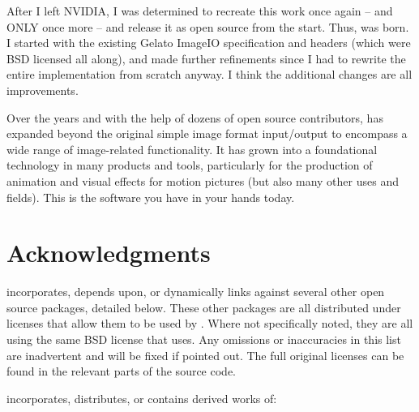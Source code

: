 After I left NVIDIA, I was determined to recreate this work once
again -- and ONLY once more -- and release it as open source from the
start.  Thus, \product was born.  I started with the existing Gelato
ImageIO specification and headers (which were BSD licensed all along),
and made further refinements since I had to rewrite the entire
implementation from scratch anyway.  I think the additional changes are
all improvements.

Over the years and with the help of dozens of open source contributors,
\product has expanded beyond the original simple image format input/output
to encompass a wide range of image-related functionality. It has grown into
a foundational technology in many products and tools, particularly for the
production of animation and visual effects for motion pictures (but also
many other uses and fields). This is the software you have in your hands
today.


\section{Acknowledgments}

\begin{comment}
The direct precursor to \product was Gelato's ImageIO, which was
co-designed and implemented by Larry Gritz, Dan Wexler, Jonathan Rice, Eric
Enderton, and Philip Nemec.

Big thanks to our bosses at NVIDIA for allowing us to share the API spec
and headers under the BSD license.  And thanks to their inability to
open source their own implementation in a timely manner, I was forced to
create this clearly superior descendant.
\end{comment}

\product incorporates, depends upon, or dynamically links against several
other open source packages, detailed below. These other packages are all
distributed under licenses that allow them to be used by \product. Where not
specifically noted, they are all using the same BSD license that \product
uses. Any omissions or inaccuracies in this list are inadvertent and will be
fixed if pointed out. The full original licenses can be found in the
relevant parts of the source code.

\smallskip
\noindent \product incorporates, distributes, or contains derived works of:

